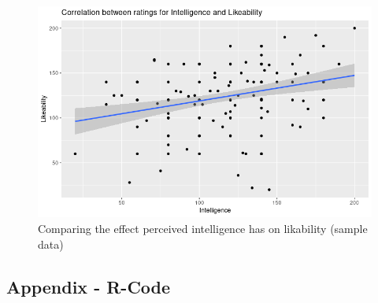 \documentclass{IEEEtran}
\begin{document}
\begin{figure}[h!]
  \centering
  \includegraphics[width=0.9\linewidth]{Images/Graphs/IntelligenceLikabilityRplot.png}
  
\caption{Comparing the effect perceived intelligence has on likability (sample data)}
\label{fig:IntelligenceLikabilityRplot}
\end{figure}

\onecolumn
\subsection{Appendix - R-Code}
\label{AppendixRCode}
\end{document}

